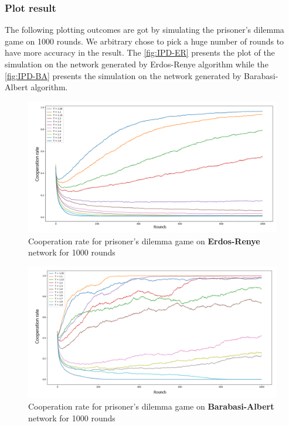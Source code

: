 \documentclass{article}
\begin{document}
\subsubsection{Plot result}
The following plotting outcomes are got by simulating the prisoner's dilemma game on 1000 rounds. We arbitrary chose to pick a huge number of rounds to have more accuracy in the result. The \autoref{fig:IPD-ER} presents the plot of the simulation on the network generated by Erdos-Renye algorithm while the \autoref{fig:IPD-BA} presents the simulation on the network generated by Barabasi-Albert algorithm. 


\begin{figure}[H]
  \centering
  \includegraphics[scale=1.55]{fig/ER-1000rounds-legend.png}
  \caption{Cooperation rate for prisoner's dilemma game on \textbf{Erdos-Renye} network for 1000 rounds}
  \label{fig:IPD-ER}
\end{figure}


\begin{figure}[H]
  \centering
  \includegraphics[scale=1.55]{fig/BA-1000rounds-legend.png}
  \caption{Cooperation rate for prisoner's dilemma game on \textbf{Barabasi-Albert} network for 1000 rounds}
  \label{fig:IPD-BA}
\end{figure}
\end{document}
